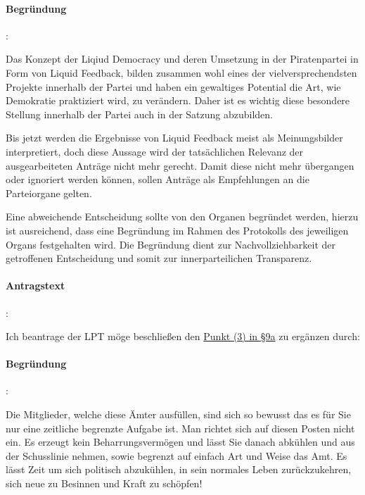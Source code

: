 \paragraph{Begründung}:

Das Konzept der Liqiud Democracy und deren Umsetzung in der Piratenpartei in Form von Liquid Feedback, bilden zusammen wohl eines der vielversprechendsten Projekte innerhalb der Partei und haben ein gewaltiges Potential die Art, wie Demokratie praktiziert wird, zu verändern. Daher ist es wichtig diese besondere Stellung innerhalb der Partei auch in der Satzung abzubilden.

Bis jetzt werden die Ergebnisse von Liquid Feedback meist als Meinungsbilder interpretiert, doch diese Aussage wird der tatsächlichen Relevanz der ausgearbeiteten Anträge nicht mehr gerecht. Damit diese nicht mehr übergangen oder ignoriert werden können, sollen Anträge als Empfehlungen an die Parteiorgane gelten.

Eine abweichende Entscheidung sollte von den Organen begründet werden, hierzu ist ausreichend, dass eine Begründung im Rahmen des Protokolls des jeweiligen Organs festgehalten wird. Die Begründung dient zur Nachvollziehbarkeit der getroffenen Entscheidung und somit zur innerparteilichen Transparenz.



\paragraph{Antragstext}:

Ich beantrage der LPT möge beschließen den \href{http://wiki.piratenpartei.de/LSA:Satzung#.C2.A7_9a_-_Der_Vorstand}{Punkt (3) in §9a} zu ergänzen durch: 


\paragraph{Begründung}:

Die Mitglieder, welche diese Ämter ausfüllen, sind sich so bewusst das es für Sie nur eine zeitliche begrenzte Aufgabe ist. Man richtet sich auf diesen Posten nicht ein. Es erzeugt kein Beharrungsvermögen und lässt Sie danach abkühlen und aus der Schusslinie nehmen, sowie begrenzt auf einfach Art und Weise das Amt. Es lässt Zeit um sich politisch abzukühlen, in sein normales Leben zurückzukehren, sich neue zu Besinnen und Kraft zu schöpfen!

